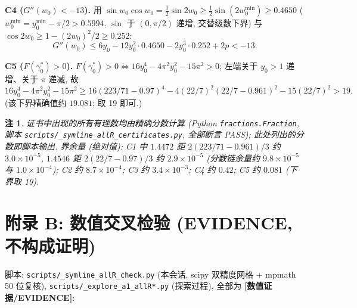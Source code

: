 \documentclass[UTF8]{ctexart}
\newtheorem{remark}[theorem]{注}
\newcommand{\EVID}{\textbf{[数值证据/EVIDENCE]}}
\begin{document}
\textbf{C4 ($G''(w_0)<-13$).} 用 $\sin w_0\cos w_0=\frac12\sin2w_0
\ge\frac12\sin(2w_0^{\min})\ge0.4650$ ($w_0^{\min}=y_0^{\min}-\pi/2
>0.5994$, $\sin$ 于 $(0,\pi/2)$ 递增, 交替级数下界) 与
$\cos2w_0\ge1-(2w_0)^2/2\ge0.252$:
\begin{equation*}
	G''(w_0)\le6y_0-12y_0^2\cdot0.4650-2y_0^3\cdot0.252+2p
	<-13.
\end{equation*}

\textbf{C5 ($F(\gamma_0^*)>0$).} $F(\gamma_0^*)>0\iff
16y_0^4-4\pi^2y_0^2-15\pi^2>0$; 左端关于 $y_0>1$ 递增、关于 $\pi$ 递减,
故
\begin{equation*}
	16y_0^4-4\pi^2y_0^2-15\pi^2
	\ge16(223/71-0.97)^4-4(22/7)^2(22/7-0.961)^2
	-15(22/7)^2
	>19.
\end{equation*}
(该下界精确值约 $19.081$; 取 19 即可.)

\begin{remark}
证书中出现的所有有理数均由精确分数计算 (Python \texttt{fractions.Fraction},
脚本 \texttt{scripts/\_symline\_allR\_certificates.py}, 全部断言 PASS);
此处列出的分数即脚本输出. 界余量 (绝对值): C1 中 $1.4472$ 距
$2(223/71-0.961)/3$ 约 $3.0\times10^{-5}$, $1.4546$ 距
$2(22/7-0.97)/3$ 约 $2.9\times10^{-5}$ (分数链余量约 $9.8\times10^{-5}$
与 $1.0\times10^{-4}$); C2 约 $8.7\times10^{-4}$; C3 约
$3.4\times10^{-3}$; C4 约 $0.42$; C5 约 $0.081$ (下界取 19).
\end{remark}

\section{附录 B: 数值交叉检验 (EVIDENCE, 不构成证明)}\label{app:evid}

脚本: \texttt{scripts/\_symline\_allR\_check.py} (本会话, scipy 双精度网格
+ mpmath 50 位复核), \texttt{scripts/\_explore\_a1\_allR*.py} (探索过程),
全部为 \EVID{}:
\end{document}
